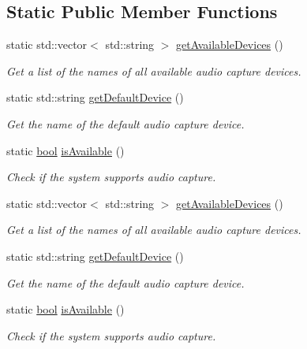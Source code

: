 \subsection*{Static Public Member Functions}
\begin{DoxyCompactItemize}
\item 
static std\-::vector$<$ std\-::string $>$ \hyperlink{classsf_1_1_sound_recorder_a26198c5c11efcd61f426f326fe314afe}{get\-Available\-Devices} ()
\begin{DoxyCompactList}\small\item\em Get a list of the names of all available audio capture devices. \end{DoxyCompactList}\item 
static std\-::string \hyperlink{classsf_1_1_sound_recorder_ad1d450a80642dab4b632999d72a1bf23}{get\-Default\-Device} ()
\begin{DoxyCompactList}\small\item\em Get the name of the default audio capture device. \end{DoxyCompactList}\item 
static \hyperlink{term__entry_8h_a002004ba5d663f149f6c38064926abac}{bool} \hyperlink{classsf_1_1_sound_recorder_aab2bd0fee9e48d6cfd449b1cb078ce5a}{is\-Available} ()
\begin{DoxyCompactList}\small\item\em Check if the system supports audio capture. \end{DoxyCompactList}\item 
static std\-::vector$<$ std\-::string $>$ \hyperlink{classsf_1_1_sound_recorder_a26198c5c11efcd61f426f326fe314afe}{get\-Available\-Devices} ()
\begin{DoxyCompactList}\small\item\em Get a list of the names of all available audio capture devices. \end{DoxyCompactList}\item 
static std\-::string \hyperlink{classsf_1_1_sound_recorder_ad1d450a80642dab4b632999d72a1bf23}{get\-Default\-Device} ()
\begin{DoxyCompactList}\small\item\em Get the name of the default audio capture device. \end{DoxyCompactList}\item 
static \hyperlink{term__entry_8h_a002004ba5d663f149f6c38064926abac}{bool} \hyperlink{classsf_1_1_sound_recorder_aab2bd0fee9e48d6cfd449b1cb078ce5a}{is\-Available} ()
\begin{DoxyCompactList}\small\item\em Check if the system supports audio capture. \end{DoxyCompactList}\end{DoxyCompactItemize}
